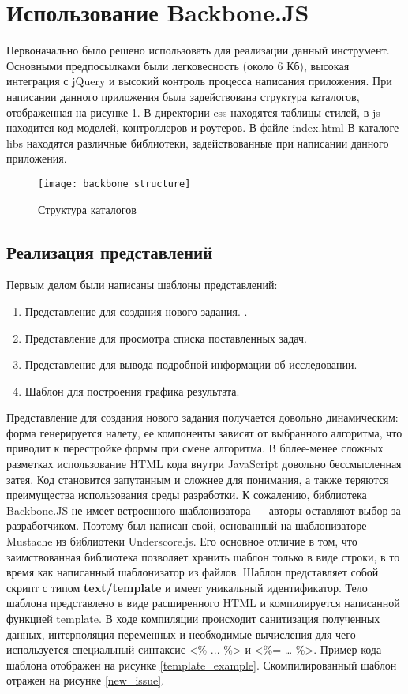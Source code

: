 \section{Использование Backbone.JS}
Первоначально было решено использовать для реализации данный инструмент. Основными предпосылками были легковесность (около 6 Кб), высокая интеграция с jQuery и высокий контроль процесса написания приложения. При написании данного приложения была задействована структура каталогов, отображенная на рисунке \ref{backbone_structure}. В директории css находятся таблицы стилей, в js находится код моделей, контроллеров и роутеров. В файле index.html  В каталоге libs находятся различные библиотеки, задействованные при написании данного приложения.

\begin{figure}[h]
\center\texttt{[image: backbone\_structure]}
\caption{Структура каталогов}\label{backbone_structure}
\end{figure}

\subsection{Реализация представлений}

Первым делом были написаны шаблоны представлений:

\begin{enumerate}
 \item Представление для создания нового задания. .
 \item Представление для просмотра списка поставленных задач.
 \item Представление для вывода подробной информации об исследовании.
 \item Шаблон для построения графика результата.
\end{enumerate}

Представление для создания нового задания получается довольно динамическим: форма генерируется налету, ее компоненты зависят от выбранного алгоритма, что приводит к перестройке формы при смене алгоритма. В более-менее сложных разметках использование HTML кода внутри JavaScript довольно бессмысленная затея. Код становится запутанным и сложнее для понимания, а также теряются преимущества использования среды разработки. К сожалению, библиотека Backbone.JS не имеет встроенного шаблонизатора --- авторы оставляют выбор за разработчиком. Поэтому был написан свой, основанный на шаблонизаторе Mustache из библиотеки Underscore.js. Его основное отличие в том, что заимствованная библиотека позволяет хранить шаблон только в виде строки, в то время как написанный шаблонизатор из файлов. Шаблон представляет собой скрипт с типом \textbf{text/template} и имеет уникальный идентификатор. Тело шаблона представлено в виде расширенного HTML и компилируется написанной функцией template. В ходе компиляции происходит санитизация полученных данных, интерполяция переменных и необходимые вычисления для чего используется специальный синтаксис <\% ... \%> и <\%= … \%>. Пример кода шаблона отображен на рисунке \ref{template_example}. Скомпилированный шаблон отражен на рисунке \ref{new_issue}.

